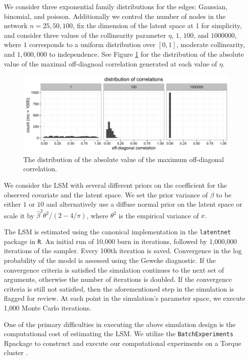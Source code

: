 \documentclass[11pt]{article}
\newcommand{\R}{\textsf{R}\space} %
\begin{document}
We consider three exponential family distributions for the edges: Gaussian, binomial, and poisson. Additionally we control the number of nodes in the network $n = 25, 50, 100$, fix the dimension of the latent space at 1 for simplicity, and consider three values of the collinearity parameter $\eta$, $1$, $100$, and $1000000$, where $1$ corresponds to a uniform distribution over $[0, 1]$, moderate collinearity, and $1,000,000$ to independence. See Figure \ref{fig:vine} for the distribution of the absolute value of the maximal off-diagnoal correlation generated at each value of $\eta$.

\begin{figure}
\includegraphics[width=\textwidth]{max_r_vine.png}
\caption{The distribution of the absolute value of the maximum off-diagonal correlation. \label{fig:vine}}
\end{figure}

We consider the LSM with several different priors on the coefficient for the observed covariate and the latent space. We set the prior variance of $\beta$ to be either $1$ or $10$ and alternatively use a diffuse normal prior on the latent space or scale it by $\hat{\beta}^2\theta^2/(2-4/\pi)$, where $\theta^2$ is the empirical variance of $x$.

The LSM is estimated using the canonical implementation in the \texttt{latentnet} package in \texttt{R}. An initial run of 10,000 burn in iterations, followed by 1,000,000 iterations of the sampler. Every 100th iteration is saved. Convergence in the log probability of the model is assessed using the Geweke diagnostic. If the convergence criteria is satisfied the simulation continues to the next set of arguments, otherwise the number of iterations is doubled. If the convergence criteria is still not satisfied, then the aforementioned step in the simulation is flagged for review. At each point in the simulation's parameter space, we execute 1,000 Monte Carlo iterations.

One of the primary difficulties in executing the above simulation design is the computational cost of estimating the LSM. We utilize the \texttt{BatchExperiments} \R package to construct and execute our computational experiments on a Torque cluster \cite{bischl2015batchjobs}.
\end{document}
